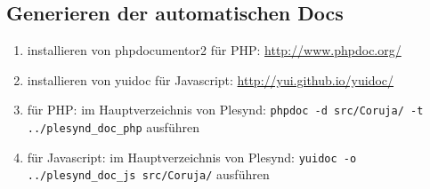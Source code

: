 \subsection*{Generieren der automatischen Docs}
\begin{enumerate}
 \item installieren von phpdocumentor2 für PHP: \url{http://www.phpdoc.org/}
 \item installieren von yuidoc für Javascript: \url{http://yui.github.io/yuidoc/}
 \item für PHP: im Hauptverzeichnis von Plesynd: \texttt{phpdoc -d src/Coruja/ -t ../plesynd\_doc\_php} ausführen
 \item für Javascript: im Hauptverzeichnis von Plesynd: \texttt{yuidoc -o ../plesynd\_doc\_js src/Coruja/} ausführen
\end{enumerate}
